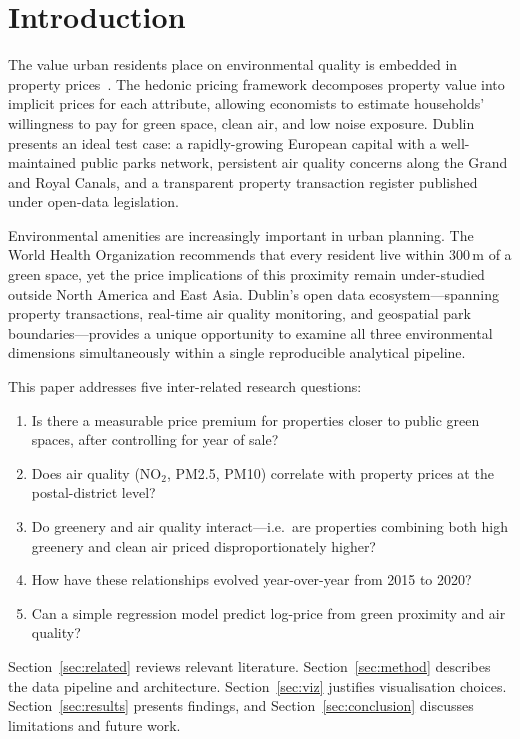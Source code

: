 \documentclass[conference]{IEEEtran}
\begin{document}
\section{Introduction}

The value urban residents place on environmental quality is embedded in
property prices~\cite{rosen1974}. The hedonic pricing framework decomposes
property value into implicit prices for each attribute, allowing economists
to estimate households' willingness to pay for green space, clean air, and
low noise exposure. Dublin presents an ideal test case: a rapidly-growing
European capital with a well-maintained public parks network, persistent
air quality concerns along the Grand and Royal Canals, and a transparent
property transaction register published under open-data legislation.

Environmental amenities are increasingly important in urban planning.
The World Health Organization recommends that every resident live within
300\,m of a green space, yet the price implications of this proximity
remain under-studied outside North America and East Asia. Dublin's open
data ecosystem---spanning property transactions, real-time air quality
monitoring, and geospatial park boundaries---provides a unique opportunity
to examine all three environmental dimensions simultaneously within a single
reproducible analytical pipeline.

This paper addresses five inter-related research questions:
\begin{enumerate}
  \item Is there a measurable price premium for properties closer to public
        green spaces, after controlling for year of sale?
  \item Does air quality (NO$_2$, PM2.5, PM10) correlate with property prices
        at the postal-district level?
  \item Do greenery and air quality interact---i.e.\ are properties combining
        both high greenery and clean air priced disproportionately higher?
  \item How have these relationships evolved year-over-year from 2015 to 2020?
  \item Can a simple regression model predict log-price from green proximity
        and air quality?
\end{enumerate}

Section~\ref{sec:related} reviews relevant literature. Section~\ref{sec:method}
describes the data pipeline and architecture. Section~\ref{sec:viz} justifies
visualisation choices. Section~\ref{sec:results} presents findings, and
Section~\ref{sec:conclusion} discusses limitations and future work.
\end{document}
